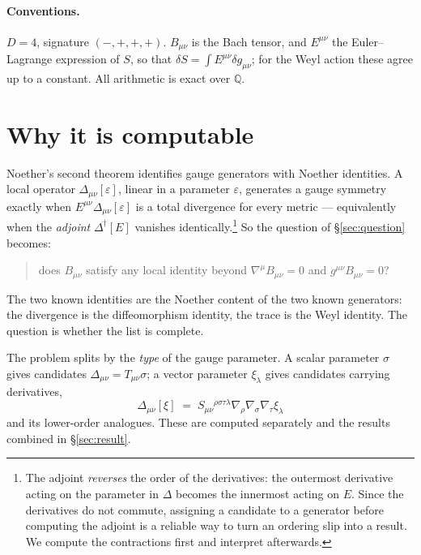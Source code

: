 \documentclass[11pt]{article}
\theoremstyle{definition}
\theoremstyle{remark}
\begin{document}
\paragraph{Conventions.}
\(D=4\), signature \((-,+,+,+)\).  \(B_{\mu\nu}\) is the Bach tensor, and
\(E^{\mu\nu}\) the Euler--Lagrange expression of \(S\), so that
\(\delta S=\int\!E^{\mu\nu}\delta g_{\mu\nu}\); for the Weyl action these
agree up to a constant.  All arithmetic is exact over \(\mathbb{Q}\).

\section{Why it is computable}
\label{sec:computable}

Noether's second theorem identifies gauge generators with Noether identities.
A local operator \(\Delta_{\mu\nu}[\varepsilon]\), linear in a parameter
\(\varepsilon\), generates a gauge symmetry exactly when
\(E^{\mu\nu}\Delta_{\mu\nu}[\varepsilon]\) is a total divergence for every
metric --- equivalently when the \emph{adjoint} \(\Delta^{\dagger}[E]\)
vanishes identically.\footnote{The adjoint \emph{reverses} the order of the
derivatives: the outermost derivative acting on the parameter in
\(\Delta\) becomes the innermost acting on \(E\).  Since the derivatives do
not commute, assigning a candidate to a generator before computing the adjoint
is a reliable way to turn an ordering slip into a result.  We compute the
contractions first and interpret afterwards.}  So the question of
\S\ref{sec:question} becomes:

\begin{quote}
does \(B_{\mu\nu}\) satisfy any local identity beyond
\(\nabla^{\mu}B_{\mu\nu}=0\) and \(g^{\mu\nu}B_{\mu\nu}=0\)?
\end{quote}

The two known identities are the Noether content of the two known generators:
the divergence is the diffeomorphism identity, the trace is the Weyl identity.
The question is whether the list is complete.

The problem splits by the \emph{type} of the gauge parameter.  A scalar
parameter \(\sigma\) gives candidates \(\Delta_{\mu\nu}=T_{\mu\nu}\sigma\); a
vector parameter \(\xi_{\lambda}\) gives candidates carrying derivatives,
\[
  \Delta_{\mu\nu}[\xi] \;=\; S_{\mu\nu}{}^{\rho\sigma\tau\lambda}
  \nabla_{\rho}\nabla_{\sigma}\nabla_{\tau}\xi_{\lambda}
\]
and its lower-order analogues.  These are computed separately and the results
combined in \S\ref{sec:result}.
\end{document}

